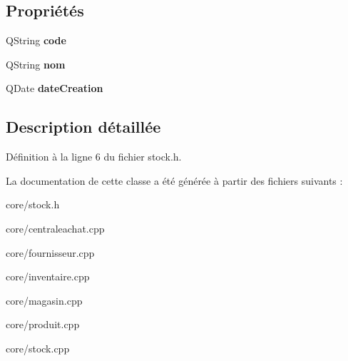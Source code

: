\subsection*{Propriétés}
\begin{DoxyCompactItemize}
\item 
\hypertarget{class_stock_a3b67b7abe80d6ec152659a3c525201ab}{
QString {\bfseries code}}
\label{d9/d1e/class_stock_a3b67b7abe80d6ec152659a3c525201ab}

\item 
\hypertarget{class_stock_a08d5184d7ccfb0750140b1310010de3b}{
QString {\bfseries nom}}
\label{d9/d1e/class_stock_a08d5184d7ccfb0750140b1310010de3b}

\item 
\hypertarget{class_stock_a9ad6ec4e4075212ba8abf4100523b946}{
QDate {\bfseries dateCreation}}
\label{d9/d1e/class_stock_a9ad6ec4e4075212ba8abf4100523b946}

\end{DoxyCompactItemize}


\subsection{Description détaillée}


Définition à la ligne 6 du fichier stock.h.



La documentation de cette classe a été générée à partir des fichiers suivants :\begin{DoxyCompactItemize}
\item 
core/stock.h\item 
core/centraleachat.cpp\item 
core/fournisseur.cpp\item 
core/inventaire.cpp\item 
core/magasin.cpp\item 
core/produit.cpp\item 
core/stock.cpp\end{DoxyCompactItemize}
